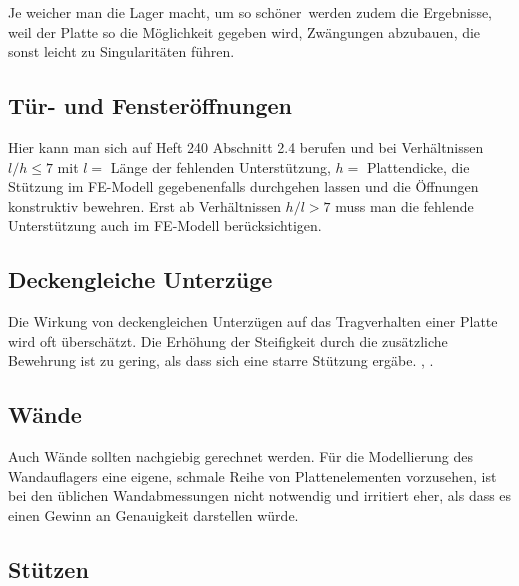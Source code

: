 Je weicher man die Lager macht, um so \glq sch\"{o}ner\grq\ werden zudem die Ergebnisse, weil der Platte so die M\"{o}glichkeit gegeben wird, Zw\"{a}ngungen abzubauen, die sonst leicht zu Singularit\"{a}ten f\"{u}hren.


{\textcolor{sectionTitleBlue}{\subsection{T\"{u}r- und Fenster\"{o}ffnungen}}}
Hier kann man sich auf Heft 240 Abschnitt 2.4 berufen und bei Verh\"{a}ltnissen $l/h \leq 7$ mit $l = $ L\"{a}nge der fehlenden Unterst\"{u}tzung, $h =$ Plattendicke, die St\"{u}tzung im FE-Modell gegebenenfalls durchgehen lassen und die \"{O}ffnungen konstruktiv bewehren. Erst ab Verh\"{a}ltnissen $h/l > 7$ muss man die fehlende Unterst\"{u}tzung auch im FE-Modell ber\"{u}cksichtigen.


{\textcolor{sectionTitleBlue}{\subsection{Deckengleiche Unterz\"{u}ge}}}
Die Wirkung von deckengleichen Unterz\"{u}gen auf das Tragverhalten einer Platte wird oft \"{u}bersch\"{a}tzt. Die Erh\"{o}hung der Steifigkeit durch die zus\"{a}tzliche Bewehrung ist zu gering, als dass sich eine starre St\"{u}tzung erg\"{a}be. \grqq, \cite{Schroeter}.

{\textcolor{sectionTitleBlue}{\subsection{W\"{a}nde}}}
Auch W\"{a}nde sollten nachgiebig gerechnet werden. F\"{u}r die Modellierung des Wandauflagers eine eigene, schmale Reihe von Plattenelementen vorzusehen, ist bei den \"{u}blichen Wandabmessungen nicht notwendig und irritiert eher, als dass es einen Gewinn an Genauigkeit darstellen w\"{u}rde.



{\textcolor{sectionTitleBlue}{\subsection{St\"{u}tzen}\label{Stuetzen}}}

